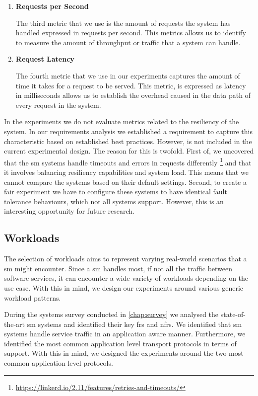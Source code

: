 \begin{enumerate}[label=\textbf{M\arabic*}, leftmargin=3\parindent]
    
    \item \textbf{Requests per Second}
    \label{exp:metric:3}
    
    The third metric that we use is the amount of requests the system has handled expressed in requests per second. This metrics allows us to identify to measure the amount of throughput or traffic that a system can handle. 

    \item \textbf{Request Latency}
    \label{exp:metric:4}
    
    The fourth metric that we use in our experiments captures the amount of time it takes for a request to be served. This metric, is expressed as latency in milliseconds allows us to establish the overhead caused in the data path of every request in the system.

\end{enumerate}

In the experiments we do not evaluate metrics related to the resiliency of the system. In our requirements analysis we established a requirement to capture this characteristic based on established best practices. However, is not included in the current experimental design. The reason for this is twofold. First of, we uncovered that the \gls{sm} systems handle timeouts and errors in requests differently \footnote{\url{https://linkerd.io/2.11/features/retries-and-timeouts/}} and that it involves balancing resiliency capabilities and system load. This means that we cannot compare the systems based on their default settings. Second, to create a fair experiment we have to configure these systems to have identical fault tolerance behaviours, which not all systems support. However, this is an interesting opportunity for future research.


\subsection{Workloads}
\label{sec:experiments:design:workloads}

The selection of workloads aims to represent varying real-world scenarios that a \gls{sm} might encounter. Since a \gls{sm} handles most, if not all the traffic between software services, it can encounter a wide variety of workloads depending on the use case. With this in mind, we design our experiments around various generic workload patterns.

During the systems survey conducted in \cref{chap:survey} we analysed the state-of-the-art \gls{sm} systems and identified their key \glspl{fr} and \glspl{nfr}. We identified that \gls{sm} systems handle service traffic in an application aware manner. Furthermore, we identified the most common application level transport protocols in terms of support. With this in mind, we designed the experiments around the two most common application level protocols. 

